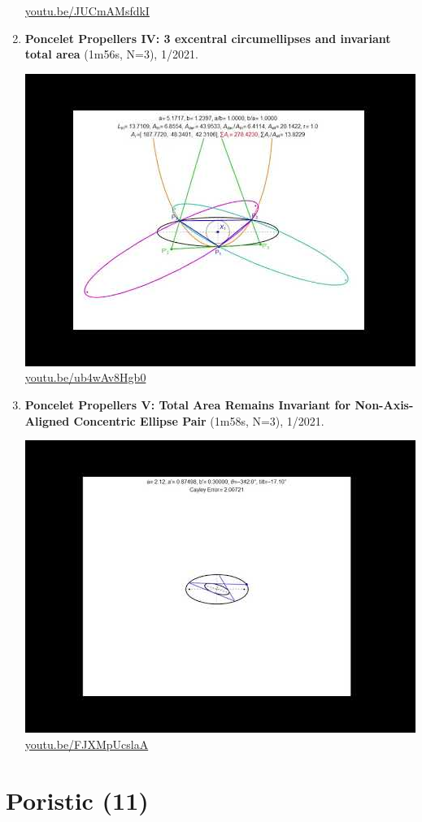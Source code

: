 \documentclass[12pt]{amsart}
\begin{document}
\begin{enumerate}[resume]
\begin{center}
\href{https://youtu.be/JUCmAMsfdkI}{\url{youtu.be/JUCmAMsfdkI}}\end{center}
% 
\item \textbf{Poncelet Propellers IV: 3 excentral circumellipses and invariant total area} (1m56s, N=3), 1/2021. 
\begin{center}\includegraphics[width=.5\textwidth]{pics/ub4wAv8Hgb0.jpg} \\ 
\href{https://youtu.be/ub4wAv8Hgb0}{\url{youtu.be/ub4wAv8Hgb0}}\end{center}
% 
\item \textbf{Poncelet Propellers V: Total Area Remains Invariant for Non-Axis-Aligned Concentric Ellipse Pair} (1m58s, N=3), 1/2021. 
\begin{center}\includegraphics[width=.5\textwidth]{pics/FJXMpUcslaA.jpg} \\ 
\href{https://youtu.be/FJXMpUcslaA}{\url{youtu.be/FJXMpUcslaA}}\end{center}
% 
\end{enumerate}

\section{Poristic (11)}
\end{document}
